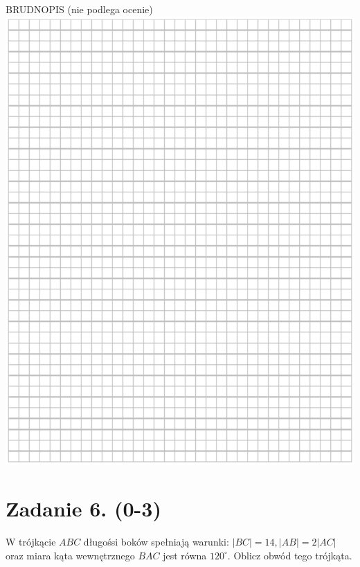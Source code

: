 \documentclass[10pt]{article}
\begin{document}
BRUDNOPIS (nie podlega ocenie)\\
\includegraphics[max width=\textwidth, center]{2024_11_21_49bfa1d51da2e7fce9c5g-03}

\section*{Zadanie 6. (0-3)}
W trójkącie \(A B C\) długośsi boków spełniają warunki: \(|B C|=14,|A B|=2|A C|\) oraz miara kąta wewnętrznego \(B A C\) jest równa \(120^{\circ}\). Oblicz obwód tego trójkąta.
\end{document}

